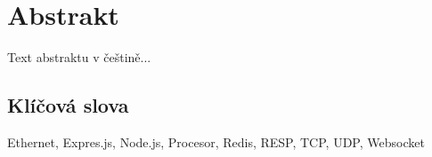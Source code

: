 \chapter*{Abstrakt}
Text abstraktu v češtině...

\vfill
\section*{Klíčová slova}
Ethernet, Expres.js, Node.js, Procesor, Redis, RESP, TCP, UDP, Websocket